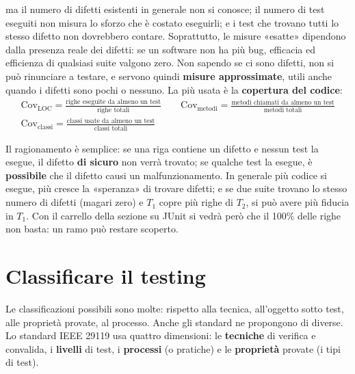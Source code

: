 ma il numero di difetti esistenti in generale non si conosce; il numero di test eseguiti non misura lo sforzo che è
costato eseguirli; e i test che trovano tutti lo stesso difetto non dovrebbero contare. Soprattutto, le misure «esatte»
dipendono dalla presenza reale dei difetti: se un software non ha più bug, efficacia ed efficienza di qualsiasi suite
valgono zero. Non sapendo se ci sono difetti, non si può rinunciare a testare, e servono quindi \textbf{misure
approssimate}, utili anche quando i difetti sono pochi o nessuno. La più usata è la \textbf{copertura del codice}:
\begin{gather*}
  \text{Cov}_{\text{LOC}} = \frac{\text{righe eseguite da almeno un test}}{\text{righe totali}}
  \qquad
  \text{Cov}_{\text{metodi}} = \frac{\text{metodi chiamati da almeno un test}}{\text{metodi totali}}
  \\[4pt]
  \text{Cov}_{\text{classi}} = \frac{\text{classi usate da almeno un test}}{\text{classi totali}}
\end{gather*}

Il ragionamento è semplice: se una riga contiene un difetto e nessun test la esegue, il difetto \textbf{di sicuro} non
verrà trovato; se qualche test la esegue, è \textbf{possibile} che il difetto causi un malfunzionamento. In generale più
codice si esegue, più cresce la «speranza» di trovare difetti; e se due suite trovano lo stesso numero di difetti
(magari zero) e \(T_1\) copre più righe di \(T_2\), si può avere più fiducia in \(T_1\). Con il carrello della
sezione su JUnit si vedrà però che il 100\% delle righe non basta: un ramo può restare scoperto.

\section{Classificare il testing}

Le classificazioni possibili sono molte: rispetto alla tecnica, all'oggetto sotto test, alle proprietà provate, al
processo. Anche gli standard ne propongono di diverse. Lo standard IEEE 29119 usa quattro dimensioni: le
\textbf{tecniche} di verifica e convalida, i \textbf{livelli} di test, i \textbf{processi} (o pratiche) e le
\textbf{proprietà} provate (i tipi di test).

